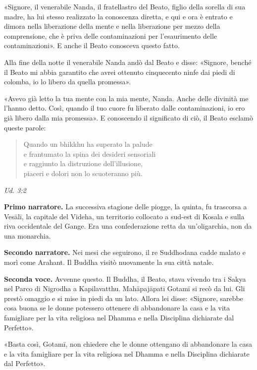 «Signore, il venerabile Nanda, il fratellastro del Beato, figlio della
sorella di sua madre, ha lui stesso realizzato la conoscenza diretta, e
qui e ora è entrato e dimora nella liberazione della mente e nella
liberazione per mezzo della comprensione, che è priva delle
contaminazioni per l’esaurimento delle contaminazioni». E anche il Beato
conosceva questo fatto.


Alla fine della notte il venerabile Nanda andò dal Beato e disse:
«Signore, benché il Beato mi abbia garantito che avrei ottenuto
cinquecento ninfe dai piedi di colomba, io lo libero da quella
promessa».


«Avevo già letto la tua mente con la mia mente, Nanda. Anche delle
divinità me l’hanno detto. Così, quando il tuo cuore fu liberato dalle
contaminazioni, io ero già libero dalla mia promessa». E conoscendo il
significato di ciò, il Beato esclamò queste parole:


\begin{quotation}
Quando un bhikkhu ha superato la palude \\
e frantumato la spina dei desideri sensoriali \\
e raggiunto la distruzione dell’illusione, \\
piaceri e dolori non lo scuoteranno più.
\end{quotation}

\emph{Ud. 3:2}


\textbf{Primo narratore.} La successiva stagione delle piogge, la quinta, fu
trascorsa a Vesālī, la capitale del Videha, un territorio collocato a
sud-est di Kosala e sulla riva occidentale del Gange. Era una
confederazione retta da un’oligarchia, non da una monarchia.


\textbf{Secondo narratore.} Nei mesi che seguirono, il re Suddhodana cadde malato
e morì come Arahant. Il Buddha visitò nuovamente la sua città natale.


\textbf{Seconda voce.} Avvenne questo. Il Buddha, il Beato, stava vivendo tra i
Sakya nel Parco di Nigrodha a Kapilavatthu. Mahāpajāpatī Gotamī si recò
da lui. Gli prestò omaggio e si mise in piedi da un lato. Allora lei
disse: «Signore, sarebbe cosa buona se le donne potessero ottenere di
abbandonare la casa e la vita famigliare per la vita religiosa nel
Dhamma e nella Disciplina dichiarate dal Perfetto».


«Basta così, Gotamī, non chiedere che le donne ottengano di abbandonare
la casa e la vita famigliare per la vita religiosa nel Dhamma e nella
Disciplina dichiarate dal Perfetto».


